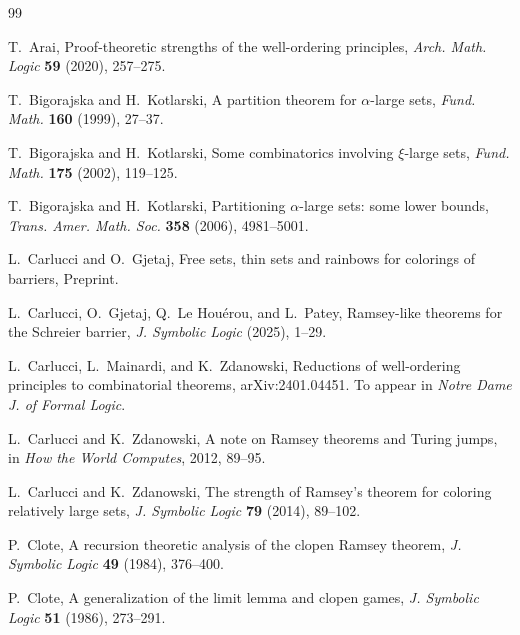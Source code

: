 \documentclass[11pt]{amsart}
\theoremstyle{definition}
\theoremstyle{remark}
\theoremstyle{plain}
\begin{document}
\begin{thebibliography}{99}

T.~Arai,
\newblock Proof-theoretic strengths of the well-ordering principles,
\newblock \emph{Arch. Math. Logic} \textbf{59} (2020), 257--275.

T.~Bigorajska and H.~Kotlarski,
\newblock A partition theorem for $\alpha$-large sets,
\newblock \emph{Fund. Math.} \textbf{160} (1999), 27--37.

T.~Bigorajska and H.~Kotlarski,
\newblock Some combinatorics involving $\xi$-large sets,
\newblock \emph{Fund. Math.} \textbf{175} (2002), 119--125.

T.~Bigorajska and H.~Kotlarski,
\newblock Partitioning {$\alpha$}-large sets: some lower bounds,
\newblock \emph{Trans. Amer. Math. Soc.} \textbf{358} (2006), 4981--5001.

L.~Carlucci and O.~Gjetaj,
\newblock Free sets, thin sets and rainbows for colorings of barriers,
\newblock Preprint.

L.~Carlucci, O.~Gjetaj, Q.~Le Hou{\'e}rou, and L.~Patey,
\newblock Ramsey-like theorems for the Schreier barrier,
\newblock \emph{J. Symbolic Logic} (2025), 1--29.

L.~Carlucci, L.~Mainardi, and K.~Zdanowski,
\newblock Reductions of well-ordering principles to combinatorial theorems,
\newblock arXiv:2401.04451.
\newblock To appear in \emph{Notre Dame J. of Formal Logic}.

L.~Carlucci and K.~Zdanowski,
\newblock A note on Ramsey theorems and Turing jumps,
\newblock in \emph{How the World Computes}, 2012, 89--95.

L.~Carlucci and K.~Zdanowski,
\newblock The strength of Ramsey's theorem for coloring relatively large sets,
\newblock \emph{J. Symbolic Logic} \textbf{79} (2014), 89--102.

P.~Clote,
\newblock A recursion theoretic analysis of the clopen Ramsey theorem,
\newblock \emph{J. Symbolic Logic} \textbf{49} (1984), 376--400.

P.~Clote,
\newblock A generalization of the limit lemma and clopen games,
\newblock \emph{J. Symbolic Logic} \textbf{51} (1986), 273--291.


\end{thebibliography}
\end{document}
